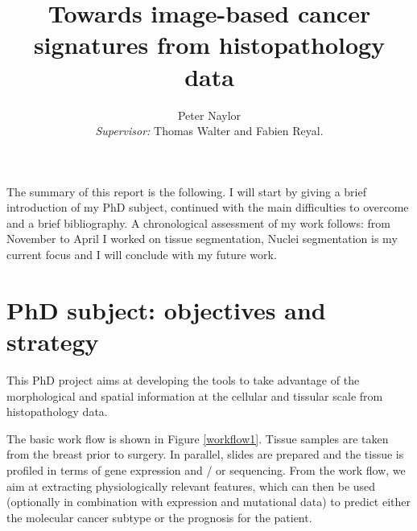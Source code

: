 \documentclass[a4paper,10pt,twocolumn]{article}
\begin{document}
\title{Towards image-based cancer signatures from histopathology data}


\author{Peter Naylor \\ {\small \textit{Supervisor:} Thomas Walter and Fabien Reyal.}}


\maketitle



The summary of this report is the following. I will start by giving a brief introduction of my PhD subject, continued with the main difficulties to overcome and a brief bibliography. A chronological assessment of my work follows: from November to April I worked on tissue segmentation, Nuclei segmentation is my current focus and I will conclude with my future work.

\section{PhD subject: objectives and strategy}

This  PhD  project aims at developing the tools to take advantage of
the morphological and spatial information at the cellular and tissular
scale from histopathology data. 


The basic work flow is shown in Figure \ref{workflow1}. Tissue samples
are taken from the breast prior to surgery. In parallel, slides are
prepared and the tissue is profiled in terms of gene expression and /
or sequencing. From the work flow, we aim at extracting physiologically
relevant features, which can then be used (optionally in combination with
expression and mutational data) to predict either the molecular
cancer subtype or the prognosis for the patient. 
\end{document}

